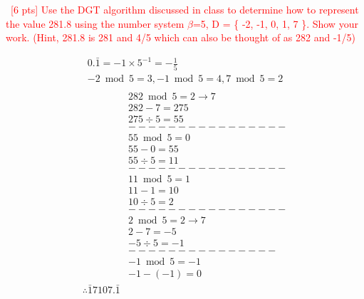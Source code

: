 \documentclass[12pt]{article}
\newenvironment{sol}[1][Solution]{\begin{trivlist}\item[\hskip\labelsep {\bfseries #1:}]}{\end{trivlist}}
\begin{document}
\begin{enumerate}
\item \ \textcolor{red}{[6 pts] Use the DGT algorithm discussed in class to determine how to represent the value 281.8 using the number system $\beta$=5, D = \{ -2, -1, 0, 1, 7 \}. Show your work. (Hint, 281.8 is 281 and 4/5 which can also be thought of as 282 and -1/5)}
\begin{sol}
    \begin{align*}
        0.\bar{1} = -1\times 5^{-1} = -\frac{1}{5}  \\
        -2 \bmod 5 = 3, -1 \bmod 5 = 4, 7 \bmod 5 = 2\\
    \end{align*}
    \begin{align*}
        & 282 \bmod 5 = 2 \rightarrow 7\\
        & 282 - 7 = 275 \\
        & 275 \div 5 = 55 \\
        & ----------------\\
        & 55 \bmod 5 = 0 \\
        & 55 - 0 = 55 \\
        & 55 \div 5 = 11 \\
        & ----------------\\
        & 11 \bmod 5 = 1 \\
        & 11 - 1 = 10\\
        & 10 \div 5 = 2\\
        & ----------------\\
        & 2 \bmod 5 = 2 \rightarrow 7 \\
        & 2 - 7 = -5\\
        & -5 \div 5 = -1\\
        & ---------------\\
        & -1 \bmod 5 = -1 \\
        & -1 - (-1) = 0\\
        \therefore \bar{1}7107.\bar{1}
    \end{align*}
\end{sol}


\end{enumerate}
\end{document}
